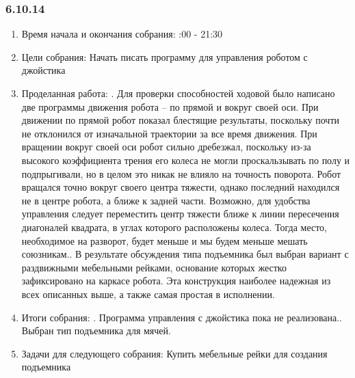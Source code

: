 \documentclass[12pt]{article}
\begin{document}
	      \subsubsection{6.10.14}
	      \begin{enumerate}
	      	\item Время начала и окончания собрания:
	      	:00 - 21:30
	      	\item Цели собрания:
	      	\newline
	      	Начать писать программу для управления роботом с джойстика
	      	\item Проделанная работа:
	      	.	Для проверки способностей ходовой было написано две программы движения робота – по прямой и вокруг своей оси. При движении по прямой робот показал блестящие результаты, поскольку почти не отклонился от изначальной траектории за все время движения. При вращении вокруг своей оси робот сильно дребезжал, поскольку из-за высокого коэффициента трения его колеса не могли проскальзывать по полу и подпрыгивали, но в целом это никак не влияло на точность поворота. Робот вращался точно вокруг своего центра тяжести, однако последний находился не в центре робота, а ближе к задней части. Возможно, для удобства управления следует переместить центр тяжести ближе к линии пересечения диагоналей квадрата, в углах которого расположены колеса. Тогда место, необходимое на разворот, будет меньше и мы будем меньше мешать союзникам..	В результате обсуждения типа подъемника был выбран вариант с раздвижными мебельными рейками, основание которых жестко зафиксировано на каркасе робота. Эта конструкция наиболее надежная из всех описанных выше, а также самая простая в исполнении.
	      	\newline
	      	\item Итоги собрания:
	      	.	Программа управления с джойстика пока не реализована..	Выбран тип подъемника для мячей.
	      	\newline
	      	\item Задачи для следующего собрания:
	      	\newline
	      	Купить мебельные рейки для создания подъемника
	      \end{enumerate}
	      \newpage
\end{document}
